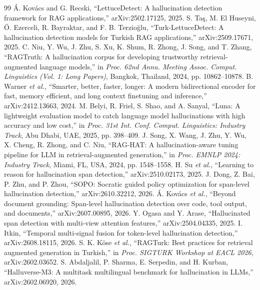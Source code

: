 \documentclass[conference,a4paper]{IEEEtran}
\begin{document}
\begin{thebibliography}{99}
 Á. Kovács and G. Recski, ``LettuceDetect: A hallucination detection framework for RAG applications,'' arXiv:2502.17125, 2025.
 S. Taş, M. El Huseyni, Ö. Ezerceli, R. Bayraktar, and F. B. Terzioğlu, ``Turk-LettuceDetect: A hallucination detection models for Turkish RAG applications,'' arXiv:2509.17671, 2025.
 C. Niu, Y. Wu, J. Zhu, S. Xu, K. Shum, R. Zhong, J. Song, and T. Zhang, ``RAGTruth: A hallucination corpus for developing trustworthy retrieval-augmented language models,'' in \emph{Proc. 62nd Annu. Meeting Assoc. Comput. Linguistics (Vol. 1: Long Papers)}, Bangkok, Thailand, 2024, pp. 10862--10878.
 B. Warner \emph{et al.}, ``Smarter, better, faster, longer: A modern bidirectional encoder for fast, memory efficient, and long context finetuning and inference,'' arXiv:2412.13663, 2024.
 M. Belyi, R. Friel, S. Shao, and A. Sanyal, ``Luna: A lightweight evaluation model to catch language model hallucinations with high accuracy and low cost,'' in \emph{Proc. 31st Int. Conf. Comput. Linguistics: Industry Track}, Abu Dhabi, UAE, 2025, pp. 398--409.
 J. Song, X. Wang, J. Zhu, Y. Wu, X. Cheng, R. Zhong, and C. Niu, ``RAG-HAT: A hallucination-aware tuning pipeline for LLM in retrieval-augmented generation,'' in \emph{Proc. EMNLP 2024: Industry Track}, Miami, FL, USA, 2024, pp. 1548--1558.
 H. Su \emph{et al.}, ``Learning to reason for hallucination span detection,'' arXiv:2510.02173, 2025.
 J. Dong, Z. Bai, P. Zhu, and P. Zhou, ``SOPO: Socratic guided policy optimization for span-level hallucination detection,'' arXiv:2610.32212, 2026.
 Á. Kovács \emph{et al.}, ``Beyond document grounding: Span-level hallucination detection over code, tool output, and documents,'' arXiv:2607.00895, 2026.
 Y. Ogasa and Y. Arase, ``Hallucinated span detection with multi-view attention features,'' arXiv:2504.04335, 2025.
 I. Itkin, ``Temporal multi-signal fusion for token-level hallucination detection,'' arXiv:2608.18115, 2026.
 S. K. Köse \emph{et al.}, ``RAGTurk: Best practices for retrieval augmented generation in Turkish,'' in \emph{Proc. SIGTURK Workshop at EACL 2026}, arXiv:2602.03652.
 S. Abdaljalil, P. Sharma, E. Serpedin, and H. Kurban, ``Halluverse-M3: A multitask multilingual benchmark for hallucination in LLMs,'' arXiv:2602.06920, 2026.

\end{thebibliography}
\end{document}
